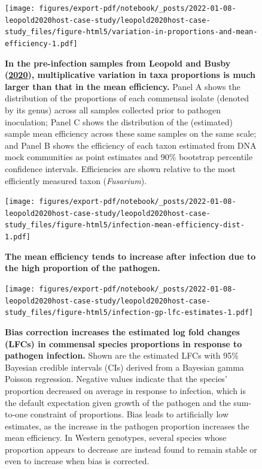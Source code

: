 \documentclass[
]{article}
\begin{document}
\begin{figure}
\centering
\texttt{[image: figures/export-pdf/notebook/\_posts/2022-01-08-leopold2020host-case-study/leopold2020host-case-study\_files/figure-html5/variation-in-proportions-and-mean-efficiency-1.pdf]}
\caption{\label{fig:leopold2020host-variation}\textbf{In the pre-infection samples from Leopold and Busby (\protect\hyperlink{ref-leopold2020host}{2020}), multiplicative variation in taxa proportions is much larger than that in the mean efficiency.} Panel A shows the distribution of the proportions of each commensal isolate (denoted by its genus) across all samples collected prior to pathogen inoculation; Panel C shows the distribution of the (estimated) sample mean efficiency across these same samples on the same scale; and Panel B shows the efficiency of each taxon estimated from DNA mock communities as point estimates and 90\% bootstrap percentile confidence intervals. Efficiencies are shown relative to the most efficiently measured taxon (\emph{Fusarium}).}
\end{figure}



\begin{figure}
\centering
\texttt{[image: figures/export-pdf/notebook/\_posts/2022-01-08-leopold2020host-case-study/leopold2020host-case-study\_files/figure-html5/infection-mean-efficiency-dist-1.pdf]}
\caption{\label{fig:leopold2020host-infection-mean-efficiency-dist}\textbf{The mean efficiency tends to increase after infection due to the high proportion of the pathogen.}}
\end{figure}



\begin{figure}
\centering
\texttt{[image: figures/export-pdf/notebook/\_posts/2022-01-08-leopold2020host-case-study/leopold2020host-case-study\_files/figure-html5/infection-gp-lfc-estimates-1.pdf]}
\caption{\label{fig:leopold2020host-infection-lfc}\textbf{Bias correction increases the estimated log fold changes (LFCs) in commensal species proportions in response to pathogen infection.} Shown are the estimated LFCs with 95\% Bayesian credible intervals (CIs) derived from a Bayesian gamma Poisson regression. Negative values indicate that the species' proportion decreased on average in response to infection, which is the default expectation given growth of the pathogen and the sum-to-one constraint of proportions. Bias leads to artificially low estimates, as the increase in the pathogen proportion increases the mean efficiency. In Western genotypes, several species whose proportion appears to decrease are instead found to remain stable or even to increase when bias is corrected.}
\end{figure}
\end{document}
